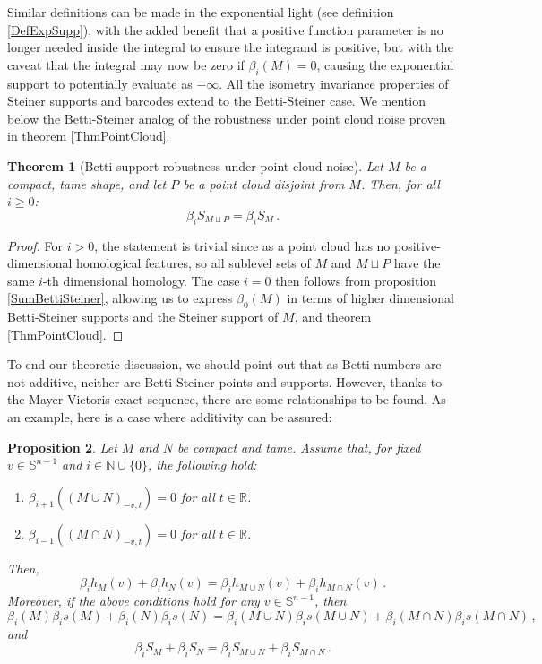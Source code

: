 \documentclass[a4paper]{article}
\newtheorem{theorem}{Theorem}[section]
\newtheorem{prop}[theorem]{Proposition}
\newcommand{\bb}{\mathbb}
\begin{document}
Similar definitions can be made in the exponential light (see definition \ref{DefExpSupp}), with the added benefit that a positive function parameter is no longer needed inside the integral to ensure the integrand is positive, but with the caveat that the integral may now be zero if $\beta_i(M) = 0$, causing the exponential support to potentially evaluate as $-\infty$. All the isometry invariance properties of Steiner supports and barcodes extend to the Betti-Steiner case. We mention below the Betti-Steiner analog of the robustness under point cloud noise proven in theorem \ref{ThmPointCloud}.

\begin{theorem}[Betti support robustness under point cloud noise]
	Let $M$ be a compact, tame shape, and let $P$ be a point cloud disjoint from $M$. Then, for all $i \geq 0$:
	\[\beta_iS_{M \sqcup P} = \beta_iS_M\, .\]
\end{theorem}

\begin{proof}
	For $i>0$, the statement is trivial since as a point cloud has no positive-dimensional homological features, so all sublevel sets of $M$ and $M \sqcup P$ have the same $i$-th dimensional homology. The case $i=0$ then follows from proposition \ref{SumBettiSteiner}, allowing us to express $\beta_0(M)$ in terms of higher dimensional Betti-Steiner supports and the Steiner support of $M$, and theorem \ref{ThmPointCloud}.
\end{proof}

To end our theoretic discussion, we should point out that as Betti numbers are not additive, neither are Betti-Steiner points and supports. However, thanks to the Mayer-Vietoris exact sequence, there are some relationships to be found. As an example, here is a case where additivity can be assured:

\begin{prop}
	Let $M$ and $N$ be compact and tame. Assume that, for fixed $v \in \bb S^{n-1}$ and $i \in \bb N \cup \{0\}$, the following hold:
	\begin{enumerate}
		\item $\beta_{i+1}((M\cup N)_{-v,t})= 0$ for all $t \in \bb R$.
		\item $\beta_{i-1}((M \cap N)_{-v,t})= 0$ for all $t \in \bb R$.
	\end{enumerate}
	Then,
	\[ \beta_ih_M(v)+\beta_ih_N(v) = \beta_ih_{M \cup N}(v) +\beta_ih_{M \cap N}(v)\, . \]
	Moreover, if the above conditions hold for any $v \in \bb S^{n-1}$, then
	\[ \beta_i(M)\beta_is(M)+\beta_i(N)\beta_is(N)=\beta_i(M \cup N)\beta_is(M \cup N)+\beta_i(M \cap N)\beta_is(M \cap N)\, , \]
	and
	\[ \beta_iS_M+\beta_iS_N= \beta_iS_{M \cup N} +\beta_iS_{M \cap N}\, . \]
\end{prop}
\end{document}

